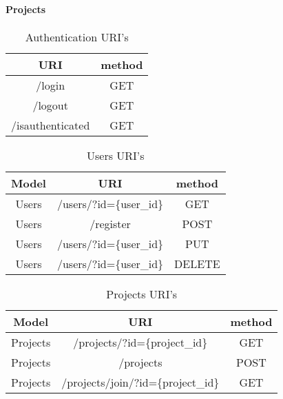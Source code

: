 \paragraph{Projects}




\begin{table}[]
\centering
\begin{tabular}{|c|c|}
\hline
\rowcolor[HTML]{32CB00} 
\textbf{URI}     & \textbf{method} \\ \hline
\rowcolor[HTML]{FFFFFF} 
/login           & GET             \\ \hline
\rowcolor[HTML]{67FD9A} 
/logout          & GET             \\ \hline
\rowcolor[HTML]{FFFFFF} 
/isauthenticated & GET             \\ \hline
\end{tabular}
\caption{Authentication URI's}
\label{authURI}
\end{table}


\begin{table}[]
\centering
\begin{tabular}{|c|c|c|}
\hline
\rowcolor[HTML]{32CB00} 
\textbf{Model} & \textbf{URI}                                                     & \textbf{method}                                     \\ \hline
\rowcolor[HTML]{FFFFFF} 
Users          & /users/?id=\{user\_id\}                                              & GET                                                 \\ \hline
\rowcolor[HTML]{67FD9A} 
Users          & /register                                                        & POST                                                \\ \hline
\rowcolor[HTML]{FFFFFF} 
Users          & /users/?id=\{user\_id\}                                              & PUT                                                 \\ \hline
\rowcolor[HTML]{67FD9A} 
Users          & \multicolumn{1}{l|}{\cellcolor[HTML]{67FD9A}/users/?id=\{user\_id\}} & \multicolumn{1}{l|}{\cellcolor[HTML]{67FD9A}DELETE} \\ \hline
\end{tabular}
\caption{Users URI's}
\label{usersURI}
\end{table}



\begin{table}[]
\centering
\begin{tabular}{|c|c|c|}
\hline
\rowcolor[HTML]{32CB00} 
\textbf{Model} & \textbf{URI}                   & \textbf{method} \\ \hline
\rowcolor[HTML]{FFFFFF} 
Projects       & /projects/?id=\{project\_id\}      & GET             \\ \hline
\rowcolor[HTML]{67FD9A} 
Projects       & /projects                      & POST            \\ \hline
\rowcolor[HTML]{FFFFFF} 
Projects       & /projects/join/?id=\{project\_id\} & GET             \\ \hline
\end{tabular}
\caption{Projects URI's}
\label{projectsURI}
\end{table}


